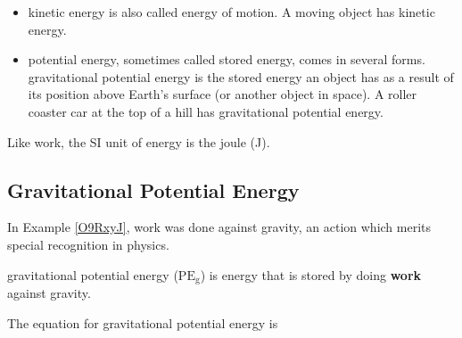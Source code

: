 \documentclass[main.tex]{subfiles}
\begin{document}
\begin{itemize}
\setlength\itemsep{-0.8ex}
    \item \Gls{kinetic energy} is also called energy of motion. A moving object has kinetic energy.
    \item \Gls{potential energy}, sometimes called stored energy, comes in several forms. \Gls{gravitational potential energy} is the stored energy an object has as a result of its position above Earth's surface (or another object in space). A roller coaster car at the top of a hill has gravitational potential energy.
\end{itemize}

Like work, the SI unit of energy is the joule (J).

\vspace{1em}

\cyanhrule


\subsection{Gravitational Potential Energy} \label{vRflRn}

In Example \ref{O9RxyJ}, work was done against gravity, an action which merits special recognition in physics.


\Gls{gravitational potential energy} ($\mathrm{PE_g}$) is energy that is stored by doing \textbf{work} against gravity.

\begin{center}
\def\height{3}
\end{center}

The equation for gravitational potential energy is
\end{document}
